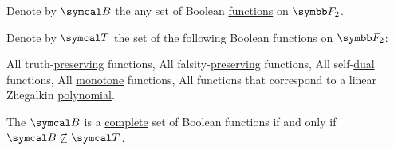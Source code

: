 \begin{theorem}\label{thm:posts_completeness_theorem}\cite{Pelletier1990}
  Denote by \( \Cal{B} \) the any set of Boolean \hyperref[def:boolean_function]{functions} on \( \BF_2 \).

  Denote by \( \Cal{T} \) the set of the following Boolean functions on \( \BF_2 \):
  \begin{thmenum}
     All truth-\hyperref[def:boolean_functions_in_f2/truth_preserving]{preserving} functions,
     All falsity-\hyperref[def:boolean_functions_in_f2/falsity_preserving]{preserving} functions,
     All self-\hyperref[def:boolean_functions_in_f2/self_dual]{dual} functions,
     All \hyperref[def:boolean_functions_in_f2/self_dual]{monotone} functions,
     All functions that correspond to a linear Zhegalkin \hyperref[def:zhegalkin_polynomial]{polynomial}.
  \end{thmenum}

  The \( \Cal{B} \) is a \hyperref[def:boolean_closure]{complete} set of Boolean functions if and only if \( \Cal{B} \not\subseteq \Cal{T} \).
\end{theorem}

